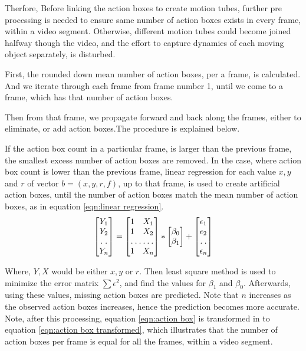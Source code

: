 Therfore, Before linking the action boxes to create motion tubes, further pre processing is needed to ensure same number of action
boxes exists in every frame, within a video segment. Otherwise, different motion tubes could become joined halfway though the video, and the 
effort to capture dynamics of each moving object separately, is disturbed. 

First, the rounded down mean number of action boxes, per a frame,
is calculated. And we iterate through each frame from frame number 1, until we come to a frame, which has that number of action boxes.

Then from that frame, we propagate forward and back along the frames, either to eliminate, or add action boxes.The procedure is explained
below. 

If the action box count in a particular frame, is larger than the previous frame, the smallest excess number of action boxes are removed.
In the case, where action box count is lower than the previous frame, linear regression for each value $x,y$ and $r$ of vector $b = (x,y,r,f)$,
up to that frame, is used to create artificial action boxes, until the number of action boxes match the mean number of action boxes, as in
equation \ref{eqn:linear regression}.
\begin{equation}
\label{eqn:linear regression}
\begin{bmatrix}
    Y_{1}     \\
    Y_{2}     \\
    \hdotsfor{1} \\
    Y_{n}     
\end{bmatrix}
=
\begin{bmatrix}
    1 & X_{1}     \\
    1 & X_{2}     \\
    \hdotsfor{2} \\
    1 & X_{n}     
\end{bmatrix}
*
\begin{bmatrix}
    \beta_{0}     \\
    \beta_{1}      
\end{bmatrix}
+
\begin{bmatrix}
    \epsilon_{1}     \\
    \epsilon_{2}    \\
    \hdotsfor{1} \\
    \epsilon_{n}    
\end{bmatrix}
\end{equation}

Where, $Y, X$ would be either $x,y$ or $r$. Then least square method is used to minimize the error matrix $\sum{\epsilon^2}$, and find the 
values for $\beta_{1}$ and $\beta_{0}$. Afterwards, using these values, missing action boxes are predicted.
Note that $n$ increases as the observed action boxes
increases, hence the prediction becomes more accurate. Note, after this processing, equation \ref{eqn:action box}
is transformed in to equation \ref{eqn:action box transformed}, 
which illustrates that the number of action boxes per frame is equal for all the frames, within a video segment. 

